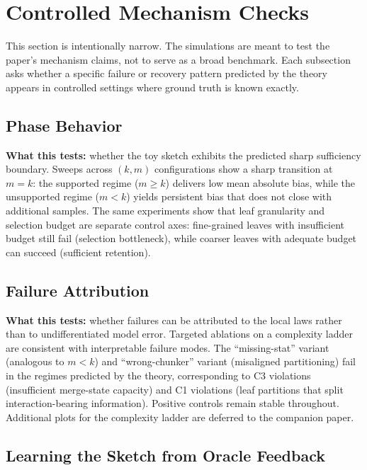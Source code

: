 \section{Controlled Mechanism Checks}\label{sec:empirical}

This section is intentionally narrow. The simulations are meant to test the paper's mechanism claims, not to serve as a broad benchmark. Each subsection asks whether a specific failure or recovery pattern predicted by the theory appears in controlled settings where ground truth is known exactly.

\subsection{Phase Behavior}

\textbf{What this tests:} whether the toy sketch exhibits the predicted sharp sufficiency boundary. Sweeps across $(k,m)$ configurations show a sharp transition at $m = k$: the supported regime ($m \ge k$) delivers low mean absolute bias, while the unsupported regime ($m < k$) yields persistent bias that does not close with additional samples. The same experiments show that leaf granularity and selection budget are separate control axes: fine-grained leaves with insufficient budget still fail (selection bottleneck), while coarser leaves with adequate budget can succeed (sufficient retention).

\subsection{Failure Attribution}

\textbf{What this tests:} whether failures can be attributed to the local laws rather than to undifferentiated model error. Targeted ablations on a complexity ladder are consistent with interpretable failure modes. The ``missing-stat'' variant (analogous to $m < k$) and ``wrong-chunker'' variant (misaligned partitioning) fail in the regimes predicted by the theory, corresponding to C3 violations (insufficient merge-state capacity) and C1 violations (leaf partitions that split interaction-bearing information). Positive controls remain stable throughout. Additional plots for the complexity ladder are deferred to the companion paper.

\subsection{Learning the Sketch from Oracle Feedback}\label{sec:learned-sketch}

